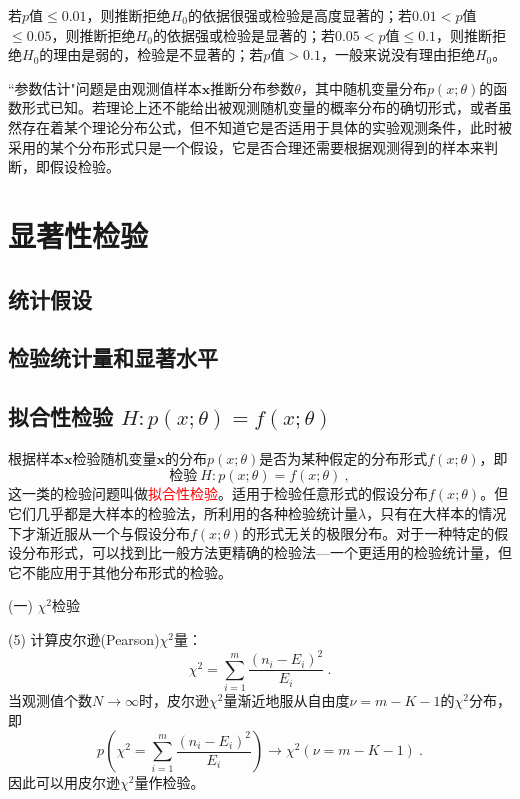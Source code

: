\documentclass[12pt,a4paper]{article}
\renewcommand{\vec}[1]{\boldsymbol{#1}}
\begin{document}
若$p$值$\leqslant 0.01$，则推断拒绝$H_0$的依据很强或检验是高度显著的；若$0.01 < p$值$\leqslant 0.05$，则推断拒绝$H_0$的依据强或检验是显著的；若$0.05 < p$值$\leqslant 0.1$，则推断拒绝$H_0$的理由是弱的，检验是不显著的；若$p$值$> 0.1$，一般来说没有理由拒绝$H_0$。




\cite{1980实验的数学处理} ``参数估计"问题是由观测值样本$\vec{x}$推断分布参数$\theta$，其中随机变量分布$p(x; \theta)$的函数形式已知。若理论上还不能给出被观测随机变量的概率分布的确切形式，或者虽然存在着某个理论分布公式，但不知道它是否适用于具体的实验观测条件，此时被采用的某个分布形式只是一个假设，它是否合理还需要根据观测得到的样本来判断，即假设检验。

\section{显著性检验}

\subsection{统计假设}

\subsection{检验统计量和显著水平}


\subsection{拟合性检验 $H: p(x; \theta) = f(x; \theta)$}
根据样本$\vec{x}$检验随机变量$\vec{x}$的分布$p(x; \theta)$是否为某种假定的分布形式$ f(x; \theta)$，即
\begin{equation*}
\text{检验} ~ H: p(x; \theta) = f(x; \theta) ~,
\end{equation*}
这一类的检验问题叫做\textcolor{red}{拟合性检验}。适用于检验任意形式的假设分布$f(x; \theta)$。但它们几乎都是大样本的检验法，所利用的各种检验统计量$\lambda$，只有在大样本的情况下才渐近服从一个与假设分布$f(x; \theta)$的形式无关的极限分布。对于一种特定的假设分布形式，可以找到比一般方法更精确的检验法---一个更适用的检验统计量，但它不能应用于其他分布形式的检验。



(一) $\chi^2$检验


(5) 计算皮尔逊(Pearson)$\chi^2$量：
\begin{equation}
\chi^2 = \sum_{i=1}^m \dfrac{(n_i -E_i)^2}{E_i} ~.
\end{equation}
当观测值个数$N \rightarrow \infty$时，皮尔逊$\chi^2$量渐近地服从自由度$\nu = m - K - 1$的$\chi^2$分布，即
\begin{equation}
p\left(\chi^2 = \sum_{i=1}^m \dfrac{(n_i-E_i)^2}{E_i} \right) \rightarrow \chi^2(\nu = m - K -1) ~.
\end{equation}
因此可以用皮尔逊$\chi^2$量作检验。
\end{document}
